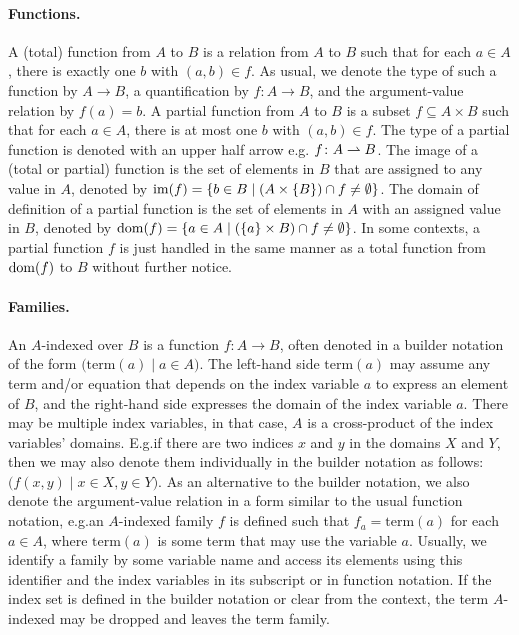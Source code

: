 \documentclass[../document.tex]{subfiles}
\begin{document}
    \paragraph{Functions.}
    A (total) function from \(A\) to \(B\) is a relation from \(A\) to \(B\) such that for each \(a \in A\), there is exactly one \(b\) with \((a,b) \in f\).
    As usual, we denote the type of such a function by \(A \to B\), a quantification by \(f\colon A \to B\), and the argument-value relation by \(f(a) = b\).
    A partial function from \(A\) to \(B\) is a subset \(f \subseteq A \times B\) such that for each \(a \in A\), there is at most one \(b\) with \((a,b) \in f\).
    The type of a partial function is denoted with an upper half arrow e.g. \(f\colon A \rightharpoonup B\).
    The image of a (total or partial) function is the set of elements in \(B\) that are assigned to any value in \(A\), denoted by \(\operatorname{im}(f) = \{b\in B \mid (A \times \{B\}) \cap f \neq \emptyset\}\).
    The domain of definition of a partial function is the set of elements in \(A\) with an assigned value in \(B\), denoted by \(\operatorname{dom}(f) = \{a\in A \mid (\{a\} \times B) \cap f \neq \emptyset\}\).
    In some contexts, a partial function \(f\) is just handled in the same manner as a total function from \(\operatorname{dom}(f)\) to \(B\) without further notice.

    \paragraph{Families.}
    An \(A\)-indexed  over \(B\) is a function \(f\colon A \to B\), often  denoted in a builder notation of the form \(\big(\mathrm{term}(a) \mid a \in A\big)\).
    The left-hand side \(\mathrm{term}(a)\) may assume any term and/or equation that depends on the index variable \(a\) to express an element of \(B\), and the right-hand side expresses the domain of the index variable \(a\).
    There may be multiple index variables, in that case, \(A\) is a cross-product of the index variables' domains.
    E.g.\@ if there are two indices \(x\) and \(y\) in the domains \(X\) and \(Y\), then we may also denote them individually in the builder notation as follows: \(\big( f(x,y) \mid x \in X, y \in Y \big)\).
    As an alternative to the builder notation, we also denote the argument-value relation in a form similar to the usual function notation, e.g.\@ an \(A\)-indexed family \(f\) is defined such that \(f_a = \mathrm{term}(a)\) for each \(a \in A\), where \(\mathrm{term}(a)\) is some term that may use the variable \(a\).
    Usually, we identify a family by some variable name and access its elements using this identifier and the index variables in its subscript or in function notation.
    If the index set is defined in the builder notation or clear from the context, the term \(A\)-indexed may be dropped and leaves the term family.
\end{document}
